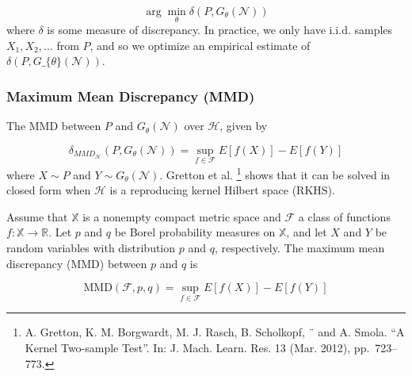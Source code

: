 \documentclass[]{article}
\begin{document}
\[
\arg \min_{\theta} \delta(P, G_{\theta}(\mathcal N))
\] where \(\delta\) is some measure of discrepancy. In practice, we only
have i.i.d. samples \(X_1, X_2,...\) from \(P\), and so we optimize an
empirical estimate of $ \delta(P, G\_\{\theta\}(\mathcal N))$.

\subsubsection{Maximum Mean Discrepancy
(MMD)}\label{maximum-mean-discrepancy-mmd}

The MMD between \(P\) and \(G_{\theta}(\mathcal N)\) over
\(\mathcal H\), given by

\[
\delta_{MMD_{\mathcal H}} (P, G_{\theta}(\mathcal N)) = \sup_{f \in \mathcal F} E[f(X)] - E[f(Y)]
\] where \(X \sim P\) and \(Y \sim G_{\theta}(\mathcal N)\). Gretton et
al. \footnote{A. Gretton, K. M. Borgwardt, M. J. Rasch, B. Scholkopf, ¨
  and A. Smola. ``A Kernel Two-sample Test''. In: J. Mach. Learn. Res.
  13 (Mar. 2012), pp.~723--773.} shows that it can be solved in closed
form when \(\mathcal H\) is a reproducing kernel Hilbert space (RKHS).

Assume that \(\mathbb X\) is a nonempty compact metric space and
\(\mathcal F\) a class of functions
\(f: \mathbb X \rightarrow \mathbb R\). Let \(p\) and \(q\) be Borel
probability measures on \(\mathbb X\), and let \(X\) and \(Y\) be random
variables with distribution \(p\) and \(q\), respectively. The maximum
mean discrepancy (MMD) between \(p\) and \(q\) is

\[
\text{MMD}(\mathcal F, p,q) = \sup_{f \in \mathcal F} E[f(X)] - E[f(Y)]
\]
\end{document}
